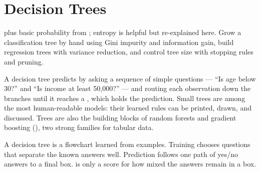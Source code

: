 \chapter{Decision Trees}
\label{ch:decision-trees}

\chapterguide%
  { plus basic probability from ; entropy is helpful but re-explained here.}
  {Grow a classification tree by hand using Gini impurity and information gain, build regression trees with variance reduction, and control tree size with stopping rules and pruning.}

A decision tree predicts by asking a sequence of simple questions --- ``Is age below 30?'' and ``Is income at least 50{,}000?'' --- and routing each observation down the branches until it reaches a , which holds the prediction. Small trees are among the most human-readable models: their learned rules can be printed, drawn, and discussed. Trees are also the building blocks of random forests and gradient boosting (), two strong families for tabular data.

\begin{firstread}
A decision tree is a flowchart learned from examples. Training chooses questions that separate the known answers well. Prediction follows one path of yes/no answers to a final box.  is only a score for how mixed the answers remain in a box.
\end{firstread}

\begin{mlfigure}
\end{mlfigure}

